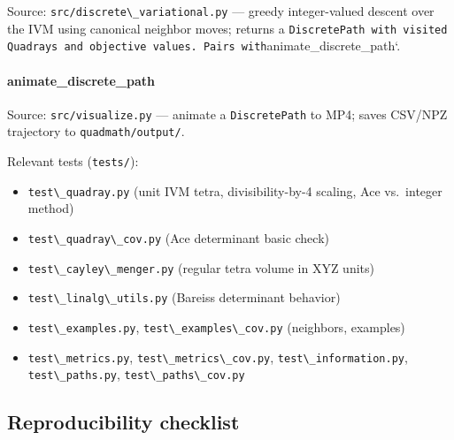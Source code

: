 \documentclass[
  10pt,
]{article}
\newcommand{\passthrough}[1]{#1}
\providecommand{\tightlist}{%
  \setlength{\itemsep}{0pt}\setlength{\parskip}{0pt}}
\renewcommand{\texttt}[1]{%
    \colorbox{codebg}{\color{codefg}\ttfamily #1}%
}
\begin{document}
Source: \passthrough{\lstinline!src/discrete\_variational.py!} ---
greedy integer-valued descent over the IVM using canonical neighbor
moves; returns a
\passthrough{\lstinline!DiscretePath with visited Quadrays and objective values. Pairs with!}animate\_discrete\_path`.

\hypertarget{code:animate_discrete_path}{%
\paragraph{\texorpdfstring{\texttt{animate\_discrete\_path}}{animate\_discrete\_path}}\label{code:animate_discrete_path}}

Source: \passthrough{\lstinline!src/visualize.py!} --- animate a
\passthrough{\lstinline!DiscretePath!} to MP4; saves CSV/NPZ trajectory
to \passthrough{\lstinline!quadmath/output/!}.

Relevant tests (\passthrough{\lstinline!tests/!}):

\begin{itemize}
\tightlist
\item
  \passthrough{\lstinline!test\_quadray.py!} (unit IVM tetra,
  divisibility-by-4 scaling, Ace vs.~integer method)
\item
  \passthrough{\lstinline!test\_quadray\_cov.py!} (Ace determinant basic
  check)
\item
  \passthrough{\lstinline!test\_cayley\_menger.py!} (regular tetra
  volume in XYZ units)
\item
  \passthrough{\lstinline!test\_linalg\_utils.py!} (Bareiss determinant
  behavior)
\item
  \passthrough{\lstinline!test\_examples.py!},
  \passthrough{\lstinline!test\_examples\_cov.py!} (neighbors, examples)
\item
  \passthrough{\lstinline!test\_metrics.py!},
  \passthrough{\lstinline!test\_metrics\_cov.py!},
  \passthrough{\lstinline!test\_information.py!},
  \passthrough{\lstinline!test\_paths.py!},
  \passthrough{\lstinline!test\_paths\_cov.py!}
\end{itemize}

\hypertarget{reproducibility-checklist}{%
\subsection{Reproducibility checklist}\label{reproducibility-checklist}}
\end{document}
